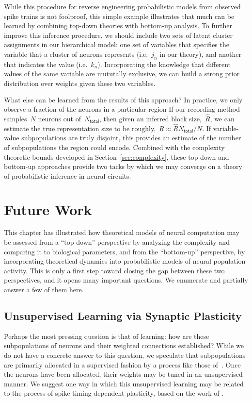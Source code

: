 While this procedure for reverse engineering probabilistic models
from observed spike trains is not foolproof, this simple example
illustrates that much can be learned by combining top-down theories
with bottom-up analysis. To further improve this inference procedure,
we should include two sets of latent cluster assignments in our
hierarchical model: one set of variables that specifies the
variable that a cluster of neurons represents (i.e.~$j_n$ in our
theory), and another that indicates the value (i.e.~$k_n$).
Incorporating the knowledge that different values of the same variable
are mututally exclusive, we can build a strong prior distribution
over weights given these two variables. 

What else can be learned from the results of this approach? In
practice, we only observe a fraction of the neurons in a particular
region If our recording method samples~$N$ neurons out
of~$N_{\mathsf{total}}$, then given an inferred block
size,~$\widehat{R}$, we can estimate the true representation size to
be roughly,~$R\approx \widehat{R} N_{\mathsf{total}} / N$. If variable-value
subpopulations are truly disjoint, this provides an estimate of the
number of subpopulations the region could encode. Combined with the
complexity theoretic bounds developed in Section~\ref{sec:complexity},
these top-down and bottom-up approaches provide two tacks  by which we may 
converge on a theory of probabilistic inference in neural circuits.

\section{Future Work}

This chapter has illustrated how theoretical models of neural computation
may be assessed from a ``top-down'' perspective by analyzing the complexity
and comparing it to biological parameters, and from the ``bottom-up'' perspective,
by incorporating theoretical dynamics into probabilistic models of neural
population activity. This is only a first step toward closing the gap
between these two perspectives, and it opens many important questions.
We enumerate and partially answer a few of them here.

\subsection{Unsupervised Learning via Synaptic Plasticity}
\label{sec:learning}
Perhaps the most pressing question is that of learning: how are these
subpopulations of neurons and their weighted connections established?
While we do not have a concrete answer to this question, we
speculate that subpopulations are primarily allocated in a supervised
fashion by a process like those of~\citet{valiant1994circuits}.
Once the neurons have been allocated, their weights may be tuned
in an unsupervised manner. We suggest one way in which this unsupervised
learning may be related to the process of spike-timing dependent
plasticity, based on the work of \citet{nessler2013bayesian}.

